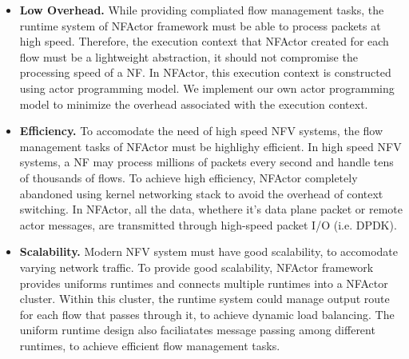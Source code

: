 \begin{itemize}


\item \textbf{Low Overhead.} While providing compliated flow management tasks, the runtime system of NFActor framework must be able to process packets at high speed. Therefore, the execution context that NFActor created for each flow must be a lightweight abstraction, it should not compromise the processing speed of a NF. In NFActor, this execution context is constructed using actor programming model. We implement our own actor programming model to minimize the overhead associated with the execution context.


\item \textbf{Efficiency.} To accomodate the need of high speed NFV systems, the flow management tasks of NFActor must be highlighy efficient. In high speed NFV systems, a NF may process millions of packets every second and handle tens of thousands of flows. To achieve high efficiency, NFActor completely abandoned using kernel networking stack to avoid the overhead of context switching. In NFActor, all the data, whethere it's data plane packet or remote actor messages, are transmitted through high-speed packet I/O (i.e. DPDK).


\item \textbf{Scalability.} Modern NFV system must have good scalability, to accomodate varying network traffic. To provide good scalability, NFActor framework provides uniforms runtimes and connects multiple runtimes into a NFActor cluster. Within this cluster, the runtime system could manage output route for each flow that passes through it, to achieve dynamic load balancing. The uniform runtime design also faciliatates message passing among different runtimes, to achieve efficient flow management tasks.

\end{itemize}

